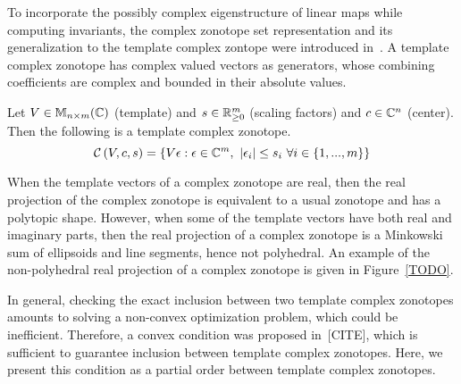 To incorporate the possibly complex eigenstructure of linear maps while
computing invariants, the complex zonotope set representation and its
generalization to the template complex zontope were introduced
in~\cite{todo}.  A template complex zonotope has complex valued
vectors as generators, whose combining coefficients are complex and
bounded in their absolute values.

\begin{definition}
Let $V\in\mathbb{M}_{n\times m}(\mathbb{\mathbb{C}})$ (template) and $s\in\mathbb{R}^m_{\geq 0}$ (scaling factors) and
$c\in\mathbb{C}^n$ (center).  Then the following is a template complex zonotope.
\begin{equation*}
\mathcal{C}\left(V,c,s\right) =
\left\{V\epsilon:\epsilon\in\mathbb{C}^m,~\left|\epsilon_i\right|\leq s_i~\forall
i\in\{1,...,m\}\right\}
\end{equation*}
\end{definition}

When the template vectors of a complex zonotope are real, then the
real projection of the complex zonotope is equivalent to a usual
zonotope and has a polytopic shape.  However, when some of the
template vectors have both real and imaginary parts, then the real
projection of a complex zonotope is a Minkowski sum of ellipsoids and
line segments, hence not polyhedral.  An example of the non-polyhedral
real projection of a complex zonotope is given in Figure~\ref{TODO}.


In general, checking the exact inclusion between two template complex
zonotopes amounts to solving a non-convex optimization problem, which
could be inefficient.  Therefore, a convex condition was proposed
in~[CITE], which is sufficient to guarantee inclusion between template
complex zonotopes.  Here, we present this condition as a
partial order between template complex zonotopes.

